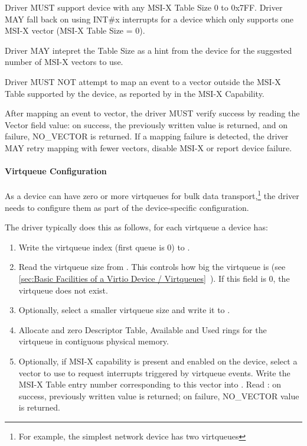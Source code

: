 Driver MUST support device with any MSI-X Table Size 0 to 0x7FF.
Driver MAY fall back on using INT\#x interrupts for a device
which only supports one MSI-X vector (MSI-X Table Size = 0).

Driver MAY intepret the Table Size as a hint from the device
for the suggested number of MSI-X vectors to use.

Driver MUST NOT attempt to map an event to a vector
outside the MSI-X Table supported by the device,
as reported by  in the MSI-X Capability.

After mapping an event to vector, the
driver MUST verify success by reading the Vector field value: on
success, the previously written value is returned, and on
failure, NO_VECTOR is returned. If a mapping failure is detected,
the driver MAY retry mapping with fewer vectors, disable MSI-X
or report device failure.

\paragraph{Virtqueue Configuration}\label{sec:Virtio Transport Options / Virtio Over PCI Bus / PCI-specific Initialization And Device Operation / Device Initialization / Virtqueue Configuration}

As a device can have zero or more virtqueues for bulk data
transport,\footnote{For example, the simplest network device has two virtqueues} the driver
needs to configure them as part of the device-specific
configuration.

The driver typically does this as follows, for each virtqueue a device has:

\begin{enumerate}
\item Write the virtqueue index (first queue is 0) to .

\item Read the virtqueue size from . This controls how big the virtqueue is
  (see \ref{sec:Basic Facilities of a Virtio Device / Virtqueues}~). If this field is 0, the virtqueue does not exist.

\item Optionally, select a smaller virtqueue size and write it to .

\item Allocate and zero Descriptor Table, Available and Used rings for the
   virtqueue in contiguous physical memory.

\item Optionally, if MSI-X capability is present and enabled on the
  device, select a vector to use to request interrupts triggered
  by virtqueue events. Write the MSI-X Table entry number
  corresponding to this vector into . Read
  : on success, previously written value is
  returned; on failure, NO_VECTOR value is returned.
\end{enumerate}

